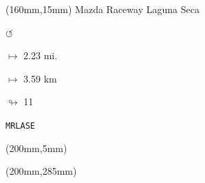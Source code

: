 \begin{textblock*}{40mm}(160mm,15mm)%
Mazda Raceway Laguna Seca
\par \Huge$\circlearrowleft$
\Large
\par$\mapsto$ 2.23 mi.
\par$\mapsto$ 3.59 km
\par$\looparrowright$ 11
\par\hfill\tiny\tt MRLASE\\
\end{textblock*}
\begin{textblock*}{20mm}(200mm,5mm)%
\fbox{\thepage}
\end{textblock*}
\begin{textblock*}{20mm}(200mm,285mm)%
\fbox{\thepage}
\end{textblock*}
\null\newpage

